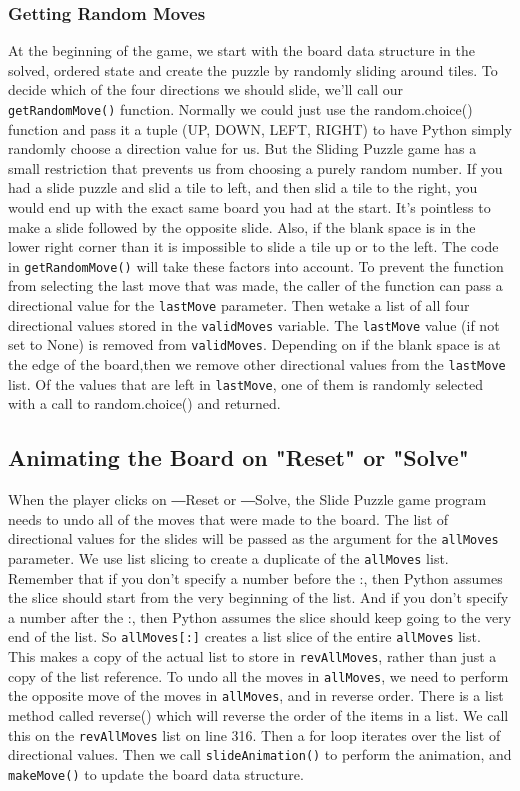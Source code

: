\subsubsection{Getting Random Moves}
At the beginning of the game, we start with the board data structure in the solved, ordered state and create the puzzle by randomly sliding around tiles. To decide which of the four directions we should slide, we’ll call our \texttt{getRandomMove()} function. Normally we could just use the random.choice() function and pass it a tuple (UP, DOWN, LEFT, RIGHT) to have Python simply randomly choose a direction value for us. But the Sliding Puzzle game has a small restriction that prevents us from choosing a purely random number.
If you had a slide puzzle and slid a tile to left, and then slid a tile to the right, you would end up with the exact same board you had at the start. It’s pointless to make a slide followed by the opposite slide. Also, if the blank space is in the lower right corner than it is impossible to slide a tile up or to the left.
The code in \texttt{getRandomMove()} will take these factors into account. To prevent the function from selecting the last move that was made, the caller of the function can pass a directional value for the \texttt{lastMove} parameter. Then wetake a list of all four directional values stored in the \texttt{validMoves} variable. The \texttt{lastMove} value (if not set to None) is removed from \texttt{validMoves}. Depending on if the blank space is at the edge of the board,then we remove other directional values from the \texttt{lastMove} list.
Of the values that are left in \texttt{lastMove}, one of them is randomly selected with a call to random.choice() and returned.
\subsection{Animating the Board on "Reset" or "Solve"}
When the player clicks on ―Reset or ―Solve, the Slide Puzzle game program needs to undo all of the moves that were made to the board. The list of directional values for the slides will be passed as the argument for the \texttt{allMoves} parameter.
We use list slicing to create a duplicate of the \texttt{allMoves} list. Remember that if you don’t specify a number before the :, then Python assumes the slice should start from the very beginning of the list. And if you don’t specify a number after the :, then Python assumes the slice should keep going to the very end of the list. So \texttt{allMoves[:]} creates a list slice of the entire \texttt{allMoves} list. This makes a copy of the actual list to store in \texttt{revAllMoves}, rather than just a copy of the list reference.
To undo all the moves in \texttt{allMoves}, we need to perform the opposite move of the moves in \texttt{allMoves}, and in reverse order. There is a list method called reverse() which will reverse the order of the items in a list. We call this on the \texttt{revAllMoves} list on line 316.
Then a for loop iterates over the list of directional values. Then we call \texttt{slideAnimation()} to perform the animation, and \texttt{makeMove()} to update the board data structure.
